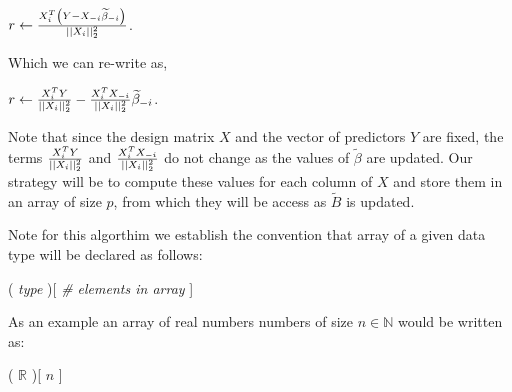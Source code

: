 \documentclass[letterpaper,11pt]{article}
\begin{document}
\begin{center}
$ r \gets \frac{ X_i^T\left( Y - X_{-i} \widetilde{\beta}_{-i}\right) }{ \lvert \lvert  X_i  \rvert \rvert_2^2 } $.
\begin{center}

Which we can re-write as,

\begin{center}
$ r \gets \frac{ X_i^T Y }{ \lvert \lvert  X_i  \rvert \rvert_2^2 } - \frac{ X_i^T X_{-i} }{ \lvert \lvert  X_i  \rvert \rvert_2^2 } \widetilde{\beta}_{-i}$.
\begin{center}

Note that since the design matrix $X$ and the vector of predictors $Y$ are fixed,
 the terms $ \frac{ X_i^T Y }{ \lvert \lvert  X_i  \rvert \rvert_2^2 } $ and $\frac{ X_i^T X_{-i} }{ \lvert \lvert  X_i  \rvert \rvert_2^2 }$
do not change as the values of $\widetilde{\beta}$ are updated. Our strategy will be to
compute these values for each column of $X$ and store them in an array of size $p$,
from which they will be access as $\widetilde{B}$ is updated.

Note for this algorthim we establish the convention that array of a given data type
will be declared as follows:
\begin{center}
( \textit{type} )[ \textit{\# elements in array} ]
\end{center}

As an example an array of real numbers numbers of size $n \in \mathbb{N}$
would be written as:
\begin{center}
( $\mathbb{R}$ )[ $n$ ]
\end{center}


\end{center}
\end{center}
\end{center}
\end{center}
\end{document}

